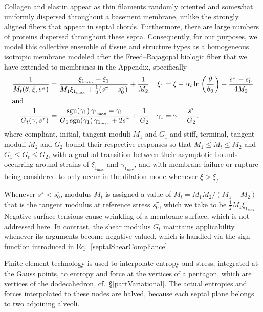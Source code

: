 Collagen and elastin appear as thin filaments randomly oriented and somewhat uniformly dispersed throughout a basement membrane, unlike the strongly aligned fibers that appear in septal chords.  Furthermore, there are large numbers of proteins dispersed throughout these septa.  Consequently, for our purposes, we model this collective ensemble of tissue and structure types as a homo\-geneous isotropic membrane modeled after the Freed--Rajagopal biologic fiber \cite{FreedRajagopal16} that we have extended to membranes \cite{Freedetal17} in the Appendix, specifically
\small
\begin{subequations}
    \label{septalCompliances}
    \begin{align}
    \frac{1}{M_t(\theta, \xi, s^{\pi})} & = 
    \frac{\xi_{1_{\max}} - \xi_1}
    {M_1 \xi_{1_{\max}} + \tfrac{1}{2}(s^{\pi} - s^{\pi}_0)} + \frac{1}{M_2} 
    & \xi_1 & = \xi - \alpha_t \ln 
    \left( \frac{\theta}{\theta_0} \right) - \frac{s^{\pi} - s^{\pi}_0}{4M_2}
    \label{septalDilationCompliance} \\
    \intertext{and}
    \frac{1}{G_t(\gamma , s^{\tau})} & = \frac{ \mathrm{sgn} (\gamma_1) \, \gamma_{1_{\max}} - \gamma_1}{G_1 \, \mathrm{sgn} (\gamma_1) \, \gamma_{1_{\max}} + 2 s^{\tau}} + \frac{1}{G_2} & 
    \gamma_1 & = \gamma - \frac{s^{\tau}}{G_2},
    \label{septalShearCompliance}
    \end{align}
\end{subequations}
\normalsize
where compliant, initial, tangent moduli $M_1$ and $G_1$ and stiff, terminal, tangent moduli $M_2$ and $G_2$ bound their respective responses so that $M_1 \leq M_t \leq M_2$ and $G_1 \leq G_t \leq G_2$, with a gradual transition between their asymp\-totic bounds occurring around strains of $\xi_{1_{\max}}$ and $\gamma_{1_{\max}}$, and with membrane failure or rupture being considered to only occur in the dilation mode whenever $\xi > \xi_f$.

Whenever $s^{\pi} < s^{\pi}_0$, modulus $M_t$ is assigned a value of $M_t = M_1 M_2 / ( M_1 + M_2 )$ that is the tangent modulus at reference stress $s^{\pi}_0$, which we take to be $\tfrac{1}{2} M_1 \xi_{1_{\max}}$.   Negative surface tensions cause wrinkling of a membrane surface, which is not addressed here.  In contrast, the shear modulus $G_t$ maintains applicability whenever its arguments become negative valued, which is handled via the sign function introduced in Eq.~\ref{septalShearCompliance}.

Finite element technology is used to interpolate entropy and stress, integrated at the Gauss points, to entropy and force at the vertices of a pentagon, which are vertices of the dodecahedron, cf.\ \S\ref{partVariational}.  The actual entropies and forces interpolated to these nodes are halved, because each septal plane belongs to two adjoining alveoli. 

